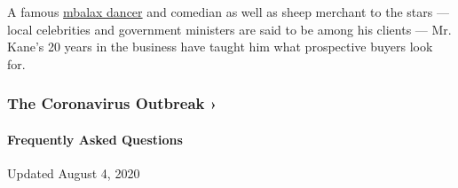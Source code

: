 A famous \href{https://www.youtube.com/watch?v=SfeOEF8zvcs}{mbalax
dancer} and comedian as well as sheep merchant to the stars --- local
celebrities and government ministers are said to be among his clients
--- Mr. Kane's 20 years in the business have taught him what prospective
buyers look for.

\href{https://www.nytimes3xbfgragh.onion/news-event/coronavirus?action=click\&pgtype=Article\&state=default\&region=MAIN_CONTENT_3\&context=storylines_faq}{}

\hypertarget{the-coronavirus-outbreak-}{%
\subsubsection{The Coronavirus Outbreak
›}\label{the-coronavirus-outbreak-}}

\hypertarget{frequently-asked-questions}{%
\paragraph{Frequently Asked
Questions}\label{frequently-asked-questions}}

Updated August 4, 2020

